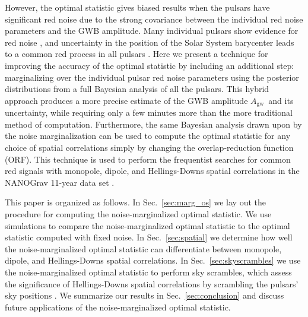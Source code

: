 \documentclass[twocolumn,aps,prd,superscriptaddress]{revtex4-1}
\newcommand{\Agw}{\ensuremath{A_\mathrm{gw}}}
\begin{document}
However, the optimal statistic gives biased results 
when the pulsars have significant red noise 
due to the strong covariance between the individual red noise parameters 
and the GWB amplitude. 
Many individual pulsars show evidence for red noise \citep{lam+2017,abb+17}, 
and uncertainty in the position of the Solar System barycenter leads to 
a common red process in all pulsars \citep{abb+17b}. 
Here we present a technique for improving the accuracy of the optimal statistic by including an additional step: 
marginalizing over the individual pulsar red noise parameters 
using the posterior distributions from a full Bayesian analysis of all the pulsars. 
This hybrid approach produces a more precise estimate of the GWB amplitude \Agw\ 
and its uncertainty, while requiring only a few minutes more than the more traditional method of computation. 
Furthermore, the same Bayesian analysis drawn upon by the noise marginalization 
can be used to compute the optimal statistic for any choice of spatial correlations 
simply by changing the overlap-reduction function (ORF). 
This technique is used to perform the frequentist searches 
for common red signals with monopole, dipole, and Hellings-Downs spatial correlations 
in the NANOGrav 11-year data set \citep{abb+17b}.

This paper is organized as follows. In Sec.~\ref{sec:marg_os} 
we lay out the procedure for computing the noise-marginalized optimal statistic. 
We use simulations to compare the noise-marginalized optimal statistic 
to the optimal statistic computed with fixed noise. 
In Sec.~\ref{sec:spatial} we determine how well 
the noise-marginalized optimal statistic can 
differentiate between monopole, dipole, and Hellings-Downs spatial correlations. 
In Sec.~\ref{sec:skyscrambles} we use the noise-marginalized optimal statistic 
to perform sky scrambles, 
which assess the significance of Hellings-Downs spatial correlations 
by scrambling the pulsars' sky positions \citep{cs2016, tlb+2017}. 
We summarize our results in Sec.~\ref{sec:conclusion} 
and discuss future applications of the noise-marginalized optimal statistic.
\end{document}
